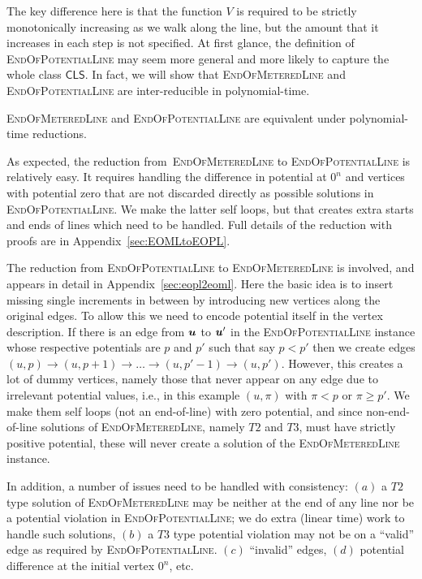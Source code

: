 \documentclass[a4paper,UKenglish]{lipics2}
\theoremstyle{definition}
\newcommand{\ra}{\rightarrow}
\def\cc#1{\mathsf{#1}}
\def\CLS{\ensuremath{\cc{CLS}}\xspace}
\def\problem#1{\textsc{#1}}
\def\EOPL{\problem{EndOfPotentialLine}\xspace}
\def\EOML{\problem{EndOfMeteredLine}\xspace}
\newcommand{\uu}{\mbox{\boldmath $u$}}
\begin{document}
The key difference here is that the function $V$ is required to be strictly
monotonically increasing as we walk along the line, but the amount that it
increases in each step is not specified.
At first glance, the definition of \EOPL may seem more general and more likely to 
capture the whole class \CLS. In fact, we will show that \EOML and \EOPL are 
inter-reducible in polynomial-time.
%
\begin{theorem}
\EOML and \EOPL are equivalent under polynomial-time reductions.
\end{theorem}
%
As expected, the reduction from~\EOML to \EOPL is relatively easy. It requires
handling the difference in potential at $0^n$ and vertices with potential zero that
are not discarded directly as possible solutions in \EOPL. We make the latter
self loops, but that creates extra starts and ends of lines which need to be
handled. Full details of the reduction with proofs are in
Appendix~\ref{sec:EOMLtoEOPL}.

The reduction from \EOPL to \EOML is involved, and appears in detail in
Appendix~\ref{sec:eopl2eoml}. Here the basic idea is to insert missing single
increments in between by introducing new vertices along the original edges. To
allow this we need to encode potential itself in the vertex description. If
there is an edge from $\uu$ to $\uu'$ in the \EOPL instance whose respective
potentials are $p$ and $p'$ such that say $p<p'$ then we create edges $(u,p)\ra
(u,p+1)\ra \dots \ra (u,p'-1)\ra (u,p')$. However, this creates a lot of dummy
vertices, namely those that never appear on any edge due to irrelevant potential
values, i.e., in this example $(u,\pi)$ with $\pi <p$ or $\pi\ge p'$. We make
them self loops (not an end-of-line) with zero potential, and since
non-end-of-line solutions of \EOML, namely $T2$ and $T3$, must have strictly
positive potential, these will never create a solution of the \EOML instance.

In addition, a number of issues need to be handled with consistency: $(a)$
a $T2$ type solution of \EOML may be neither at the end of any line nor be a 
potential violation in \EOPL; we do extra (linear time) work to handle such
solutions, $(b)$ a $T3$ type potential violation may not be on a ``valid'' edge as
required by \EOPL. $(c)$ ``invalid'' edges, $(d)$ potential difference at the
initial vertex $0^n$, etc.


\end{document}
